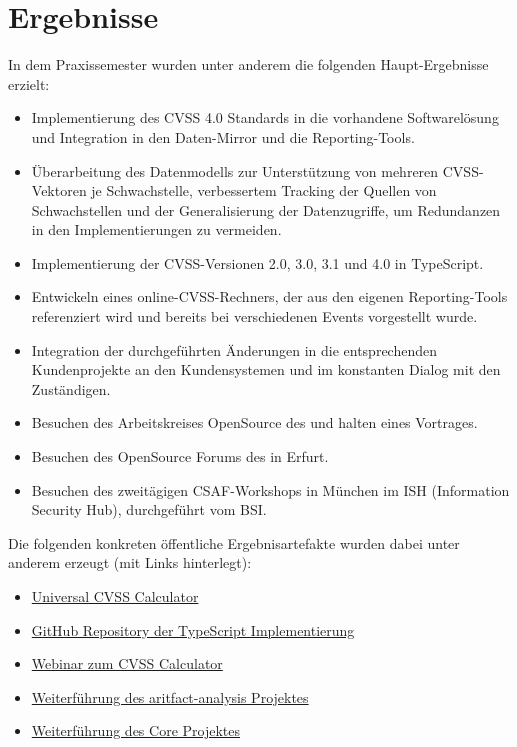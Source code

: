 
\chapter{Ergebnisse} \label{ch:ergebnisse}

In dem Praxissemester wurden unter anderem die folgenden Haupt-Ergebnisse erzielt:

\begin{itemize}
    \item Implementierung des CVSS 4.0 Standards in die vorhandene Softwarelösung und Integration in den Daten-Mirror und die Reporting-Tools.
    \item Überarbeitung des Datenmodells zur Unterstützung von mehreren CVSS-Vektoren je Schwachstelle, verbessertem Tracking der Quellen von Schwachstellen und der Generalisierung der Datenzugriffe, um Redundanzen in den Implementierungen zu vermeiden.
    \item Implementierung der CVSS-Versionen 2.0, 3.0, 3.1 und 4.0 in TypeScript.
    \item Entwickeln eines online-CVSS-Rechners, der aus den eigenen Reporting-Tools referenziert wird und bereits bei verschiedenen Events vorgestellt wurde.
    \item Integration der durchgeführten Änderungen in die entsprechenden Kundenprojekte an den Kundensystemen und im konstanten Dialog mit den Zuständigen.
    \item Besuchen des Arbeitskreises OpenSource des {\bitkom} und halten eines Vortrages.
    \item Besuchen des OpenSource Forums des {\bitkom} in Erfurt.
    \item Besuchen des zweitägigen CSAF-Workshops in München im ISH (Information Security Hub), durchgeführt vom BSI\@.
\end{itemize}

Die folgenden konkreten öffentliche Ergebnisartefakte wurden dabei unter anderem erzeugt (mit Links hinterlegt):

\begin{itemize}[noitemsep]
    \item \href{https://www.metaeffekt.com/security/cvss/calculator}{Universal CVSS Calculator}
    \item \href{https://github.com/org-metaeffekt/metaeffekt-universal-cvss-calculator}{GitHub Repository der TypeScript Implementierung}
    \item \href{https://youtu.be/R2S0_6-NQGQ?si=d7zpxbJ7P4R26nRb&t=2801}{Webinar zum CVSS Calculator}
    \item \href{https://mvnrepository.com/artifact/com.metaeffekt.artifact.analysis/ae-artifact-analysis}{Weiterführung des aritfact-analysis Projektes}
    \item \href{https://github.com/org-metaeffekt/metaeffekt-core}{Weiterführung des Core Projektes}
\end{itemize}
